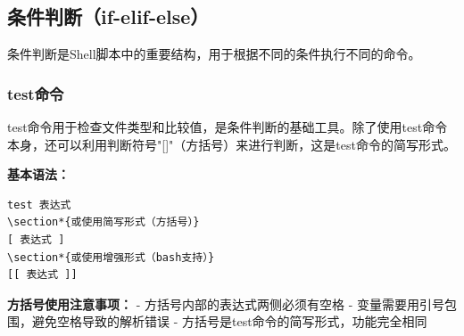 \documentclass[12pt,UTF8]{ctexbook}
\begin{document}
\subsection{条件判断（if-elif-else）}
条件判断是Shell脚本中的重要结构，用于根据不同的条件执行不同的命令。

\subsubsection{test命令}
test命令用于检查文件类型和比较值，是条件判断的基础工具。除了使用test命令本身，还可以利用判断符号"[]"（方括号）来进行判断，这是test命令的简写形式。

\textbf{基本语法：}
\begin{verbatim}
test 表达式
\section*{或使用简写形式（方括号）}
[ 表达式 ]
\section*{或使用增强形式（bash支持）}
[[ 表达式 ]]
\end{verbatim}

\textbf{方括号使用注意事项：}
- 方括号内部的表达式两侧必须有空格
- 变量需要用引号包围，避免空格导致的解析错误
- 方括号是test命令的简写形式，功能完全相同
\end{document}
